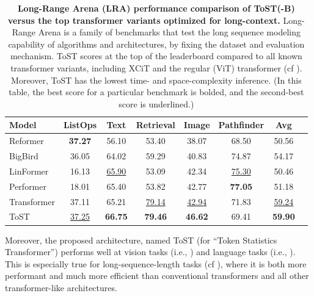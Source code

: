 \documentclass[../../book-main.tex]{subfiles}
\begin{document}
\begin{table}[t]
\centering
\begin{tabular}{@{}lccccccc@{}}
\toprule
Model        & ListOps  & Text     & Retrieval & Image    &
Pathfinder & Avg      \\
\midrule
\midrule
Reformer              & \textbf{37.27} & 56.10             & 53.40
& 38.07             & 68.50 
              & 50.56             \\
BigBird               & 36.05             & 64.02             & 59.29
& 40.83             & 74.87             
   & 54.17             \\
LinFormer         & 16.13             & \underline{65.90} & 53.09
& 42.34             & \underline{75.30}               & 50.46             \\
Performer             
 & 18.01             & 65.40             & 53.82
& 42.77             & \textbf{77.05}                & 51.18             \\
Transformer           & 37.11             & 
 65.21             &
\underline{79.14}              & \underline{42.94}             &
71.83              & \underline{59.24}            \\
ToST & \underline{37.25}    & \textbf{66.75}    & \textbf{79.46}
& \textbf{46.62}    &    69.41      &     
\textbf{59.90}\\

\bottomrule
\end{tabular}%
\caption{\small \textbf{Long-Range Arena (LRA) performance comparison
    of ToST(-B) versus the top transformer variants optimized for
long-context.} Long-Range Arena is a family of benchmarks that test
the long sequence modeling capability of algorithms and
architectures, by fixing the dataset and evaluation mechanism. ToST
scores at the top of the leaderboard compared to all known
transformer variants, including XCiT and the regular (ViT)
transformer (cf ). Moreover, ToST has
the lowest time- and space-complexity inference. (In this table, the
    best score for a particular benchmark is bolded, and the second-best
score is underlined.)}
\label{tab:tost_lra_results}
\end{table}

Moreover, the proposed architecture, named ToST (for ``Token
Statistics Transformer'') performs well at vision tasks (i.e.,
) and language tasks (i.e.,
). This is especially true for long-sequence-length
tasks (cf ), where it is both more
performant and much more efficient than conventional transformers and
all other transformer-like architectures.
\end{document}
